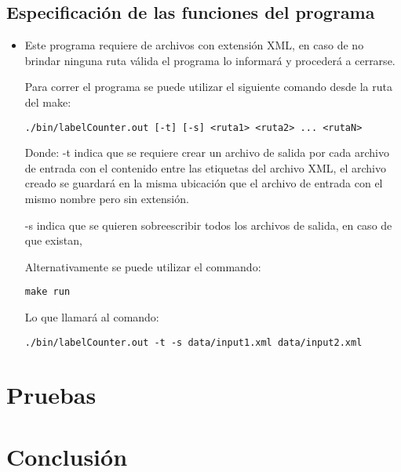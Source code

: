 \subsection{Especificación de las funciones del programa}
\begin{itemize}   
	\item[] Este programa requiere de archivos con extensión XML, en caso de no brindar ninguna ruta válida el programa lo informará y procederá a cerrarse.
    
	Para correr el programa se puede utilizar el siguiente comando desde la ruta del make:
\begin{lstlisting}[style= Cstyle]
	./bin/labelCounter.out [-t] [-s] <ruta1> <ruta2> ... <rutaN>
\end{lstlisting} 
	Donde:
 -t indica que se requiere crear un archivo de salida por cada archivo de entrada con el contenido entre las etiquetas del archivo XML, el archivo creado se guardará en la misma ubicación que el archivo de entrada con el mismo nombre pero sin extensión.

-s indica que se quieren sobreescribir todos los archivos de salida, en caso de que existan, 

	Alternativamente se puede utilizar el commando:
\begin{lstlisting}[style= Cstyle]
	make run
\end{lstlisting}
    Lo que llamará al comando:
\begin{lstlisting}[style= Cstyle]
	./bin/labelCounter.out -t -s data/input1.xml data/input2.xml
\end{lstlisting}
\end{itemize}
\section{Pruebas}

\section{Conclusión}
    

